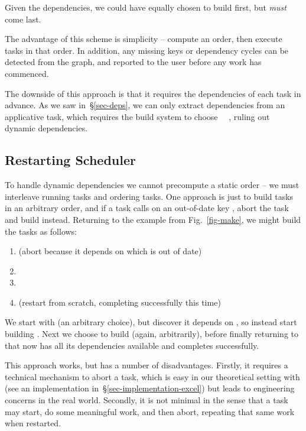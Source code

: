 \noindent
Given the dependencies, we could have equally chosen to build 
first, but  \emph{must} come last.

The advantage of this scheme is simplicity -- compute an order, then execute
tasks in that order. In addition, any missing keys or dependency cycles can be
detected from the graph, and reported to the user before any work has commenced.

The downside of this approach is that it requires the dependencies of each task
in advance. As we saw in~\S\ref{sec-deps}, we can only extract dependencies from
an applicative task, which requires the build system to choose
~\hs{=}~, ruling out dynamic dependencies.

\subsection{Restarting Scheduler}\label{sec-restarting}

To handle dynamic dependencies we cannot precompute a static order -- we must
interleave running tasks and ordering tasks. One approach is just to build tasks
in an arbitrary order, and if a task calls  on an out-of-date key
, abort the task and build  instead. Returning to the example
from Fig.~\ref{fig-make}, we might build the tasks as follows:

\begin{enumerate}
\item {} (abort because it depends on  which is out of
      date)
\item {}
\item {}
\item {} (restart from scratch, completing successfully this time)
\end{enumerate}

\noindent
We start with  (an arbitrary choice), but discover it depends on
, so instead start building . Next we choose to build
 (again, arbitrarily), before finally returning to 
that now has all its dependencies available and completes successfully.

This approach works, but has a number of disadvantages. Firstly, it requires a
technical mechanism to abort a task, which is easy in our theoretical setting
with  (see an implementation in~\S\ref{sec-implementation-excel}) but
leads to engineering concerns in the real world. Secondly, it is not minimal in
the sense that a task may start, do some meaningful work, and then abort,
repeating that same work when restarted.

